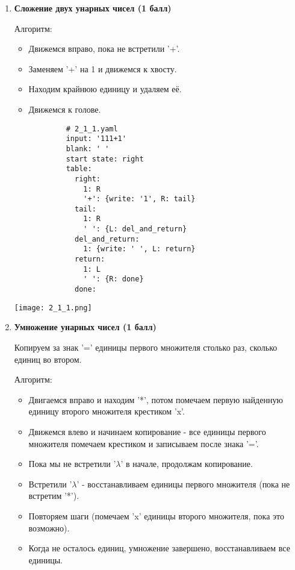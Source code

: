 \documentclass{article}
\begin{document}
\begin{enumerate}

    \item \textbf{Сложение двух унарных чисел (1 балл)}
    
        Алгоритм:
        \begin{itemize}
            \item Движемся вправо, пока не встретили '+'.
            \item Заменяем '+' на 1 и движемся к хвосту.
            \item Находим крайнюю единицу и удаляем её.
            \item Движемся к голове.
        \end{itemize}
        
        
        \begin{verbatim}
            # 2_1_1.yaml
            input: '111+1'
            blank: ' '
            start state: right
            table:
              right:
                1: R
                '+': {write: '1', R: tail}
              tail:
                1: R
                ' ': {L: del_and_return}
              del_and_return:
                1: {write: ' ', L: return}
              return:
                1: L
                ' ': {R: done}
              done:
        \end{verbatim}
        
        \begin{center}
            \texttt{[image: 2\_1\_1.png]} \\
        \end{center}
    
    \item \textbf{Умножение унарных чисел (1 балл)}
    
        Копируем за знак '=' единицы первого множителя столько раз, сколько единиц во втором.
        
        Алгоритм:
        \begin{itemize}
            
            \item Двигаемся вправо и находим '*', потом помечаем первую найденную единицу второго множителя крестиком 'x'.
            \item Движемся влево и начинаем копирование - все единицы первого множителя помечаем крестиком и записываем после знака '='.
            \item Пока мы не встретили '$\lambda$' в начале, продолжам копирование.
            \item Встретили '$\lambda$' - восстанавливаем единицы первого множителя (пока не встретим '*').
            \item Повторяем шаги (помечаем 'x' единицы второго множителя, пока это возможно).
            \item Когда не осталось единиц, умножение завершено, восстанавливаем все единицы. 
        \end{itemize}


\end{enumerate}
\end{document}
